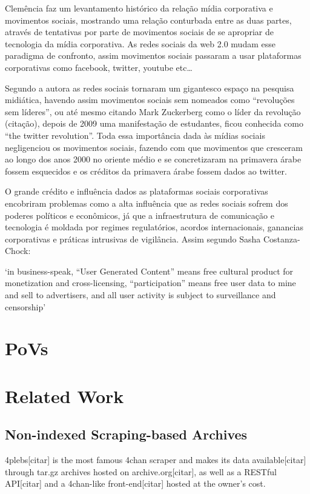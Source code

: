 Clemência faz um levantamento histórico da relação mídia corporativa e movimentos sociais, mostrando uma relação conturbada entre as duas partes, através de tentativas por parte de movimentos sociais de se apropriar de tecnologia da mídia corporativa. As redes sociais da web 2.0 mudam esse paradigma de confronto, assim movimentos sociais passaram a usar plataformas corporativas como facebook, twitter, youtube etc…

Segundo a autora as redes sociais tornaram um gigantesco espaço na pesquisa midiática, havendo assim movimentos sociais sem nomeados como “revoluções sem líderes”, ou até mesmo citando Mark Zuckerberg como o líder da revolução (citação), depois de 2009 uma manifestação de estudantes, ficou conhecida como “the twitter revolution”. Toda essa importância dada às mídias sociais negligenciou os movimentos sociais, fazendo com que movimentos que cresceram ao longo dos anos 2000 no oriente médio e se concretizaram na primavera árabe fossem esquecidos e os créditos da primavera árabe fossem dados ao twitter. 

O grande crédito e influência dados as plataformas sociais corporativas encobriram  problemas como a alta influência que as redes sociais sofrem dos poderes políticos e econômicos, já que a infraestrutura de comunicação e tecnologia é moldada por regimes regulatórios, acordos internacionais, ganancias corporativas e práticas intrusivas de vigilância. Assim segundo Sasha Costanza-Chock:

\begin{directcite}
‘in business-speak, “User Generated Content” means free cultural product for monetization and cross-licensing, “participation” means free user data to mine and sell to advertisers, and all user activity is subject to surveillance and censorship’ 
\end{directcite}

\section{PoVs}

\section{Related Work}

\subsection{Non-indexed Scraping-based Archives}
4plebs[citar] is the most famous 4chan scraper and makes its data available[citar] through tar.gz archives hosted on archive.org[citar], as well as a RESTful API[citar] and a 4chan-like front-end[citar] hosted at the owner's cost.

